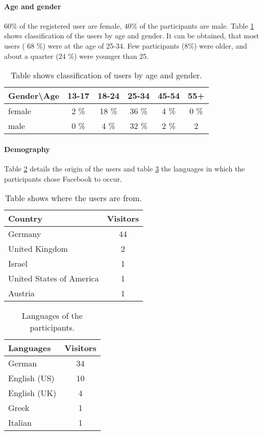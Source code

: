 \documentclass[preprint,12pt]{elsarticle}
\begin{document}
\paragraph{Age and gender}
\label{sec:age-gender}
$60 \%$ of the registered user are female, $40 \%$ of the participants
are male. Table \ref{tab:agegender} shows classification of the users
by age and gender. It can be obtained, that most users ( 68 \%) were at
the age of 25-34. Few participants ($8 \%$) were older, and about a
quarter (24 \%) were younger than 25.

\begin{center}
\begin{table}
\label{tab:agegender}
\begin{tabular}{l | c c c c c}
Gender\textbackslash Age  & 13-17 & 18-24 & 25-34 & 45-54 & 55+\\
\hline
female  & 2 \% & 18 \% & 36 \% & 4 \% & 0 \%\\
male & 0 \% & 4 \% & 32 \% & 2 \%  & 2 \\
\end{tabular}
\caption{Table shows classification of users by age and gender.}
\end{table}
\end{center}

\paragraph{Demography}
\label{sec:demographie}
Table \ref{tab:countries} details the origin of the users and table
\ref{tab:languages} the languages in which the participants chose
Facebook to occur.


\begin{center}
\begin{table}
\label{tab:countries}
\begin{tabular}{l | c }
Country  & Visitors \\
\hline
Germany  & 44 \\
United Kingdom & 2 \\
Israel & 1 \\
United States of America & 1 \\
Austria & 1 \\
\end{tabular}
\caption{Table shows where the users are from.}
\end{table}
\end{center}

\begin{center}
\begin{table}
\label{tab:languages}
\begin{tabular}{l | c }
Languages   & Visitors \\
\hline
German  & 34 \\
English (US) & 10 \\
English (UK) & 4 \\
Greek  & 1 \\
Italian & 1 \\
\end{tabular}
\caption{Languages of the participants.}
\end{table}
\end{center}
\end{document}
